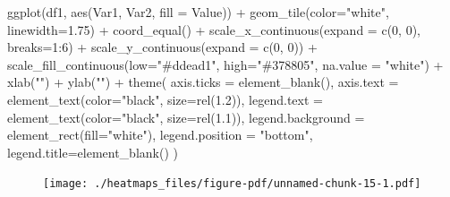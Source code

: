 \documentclass[
  letterpaper,
  DIV=11,
  numbers=noendperiod]{scrreprt}
\newenvironment{Shaded}{\begin{snugshade}}{\end{snugshade}}
\newcommand{\AttributeTok}[1]{\textcolor[rgb]{0.40,0.45,0.13}{#1}}
\newcommand{\DecValTok}[1]{\textcolor[rgb]{0.68,0.00,0.00}{#1}}
\newcommand{\FloatTok}[1]{\textcolor[rgb]{0.68,0.00,0.00}{#1}}
\newcommand{\FunctionTok}[1]{\textcolor[rgb]{0.28,0.35,0.67}{#1}}
\newcommand{\NormalTok}[1]{\textcolor[rgb]{0.00,0.23,0.31}{#1}}
\newcommand{\SpecialCharTok}[1]{\textcolor[rgb]{0.37,0.37,0.37}{#1}}
\newcommand{\StringTok}[1]{\textcolor[rgb]{0.13,0.47,0.30}{#1}}
\begin{document}
\begin{Shaded}
\begin{Highlighting}[]
\FunctionTok{ggplot}\NormalTok{(df1, }\FunctionTok{aes}\NormalTok{(Var1, Var2, }\AttributeTok{fill =}\NormalTok{ Value)) }\SpecialCharTok{+} 
  \FunctionTok{geom\_tile}\NormalTok{(}\AttributeTok{color=}\StringTok{"white"}\NormalTok{, }\AttributeTok{linewidth=}\FloatTok{1.75}\NormalTok{) }\SpecialCharTok{+}
  \FunctionTok{coord\_equal}\NormalTok{() }\SpecialCharTok{+}
  \FunctionTok{scale\_x\_continuous}\NormalTok{(}\AttributeTok{expand =} \FunctionTok{c}\NormalTok{(}\DecValTok{0}\NormalTok{, }\DecValTok{0}\NormalTok{), }\AttributeTok{breaks=}\DecValTok{1}\SpecialCharTok{:}\DecValTok{6}\NormalTok{) }\SpecialCharTok{+}
  \FunctionTok{scale\_y\_continuous}\NormalTok{(}\AttributeTok{expand =} \FunctionTok{c}\NormalTok{(}\DecValTok{0}\NormalTok{, }\DecValTok{0}\NormalTok{)) }\SpecialCharTok{+} 
  \FunctionTok{scale\_fill\_continuous}\NormalTok{(}\AttributeTok{low=}\StringTok{"\#ddead1"}\NormalTok{, }\AttributeTok{high=}\StringTok{"\#378805"}\NormalTok{, }\AttributeTok{na.value =} \StringTok{"white"}\NormalTok{) }\SpecialCharTok{+}
  \FunctionTok{xlab}\NormalTok{(}\StringTok{""}\NormalTok{) }\SpecialCharTok{+} 
  \FunctionTok{ylab}\NormalTok{(}\StringTok{""}\NormalTok{) }\SpecialCharTok{+}
  \FunctionTok{theme}\NormalTok{(}
    \AttributeTok{axis.ticks =} \FunctionTok{element\_blank}\NormalTok{(), }
    \AttributeTok{axis.text =} \FunctionTok{element\_text}\NormalTok{(}\AttributeTok{color=}\StringTok{"black"}\NormalTok{, }\AttributeTok{size=}\FunctionTok{rel}\NormalTok{(}\FloatTok{1.2}\NormalTok{)),}
    \AttributeTok{legend.text =} \FunctionTok{element\_text}\NormalTok{(}\AttributeTok{color=}\StringTok{"black"}\NormalTok{, }\AttributeTok{size=}\FunctionTok{rel}\NormalTok{(}\FloatTok{1.1}\NormalTok{)),}
    \AttributeTok{legend.background =} \FunctionTok{element\_rect}\NormalTok{(}\AttributeTok{fill=}\StringTok{"white"}\NormalTok{),}
    \AttributeTok{legend.position =} \StringTok{"bottom"}\NormalTok{,}
    \AttributeTok{legend.title=}\FunctionTok{element\_blank}\NormalTok{()}
\NormalTok{  )}
\end{Highlighting}
\end{Shaded}

\begin{figure}[H]

{\centering \texttt{[image: ./heatmaps\_files/figure-pdf/unnamed-chunk-15-1.pdf]}

}

\end{figure}
\end{document}
